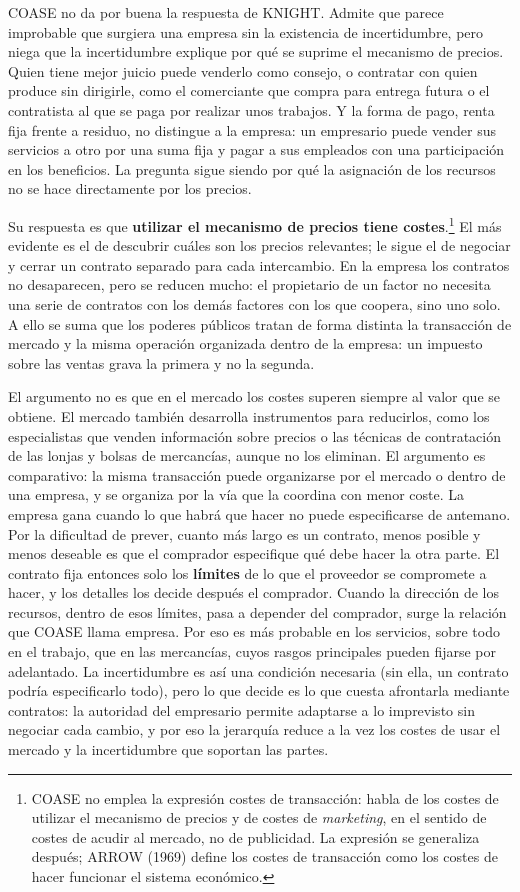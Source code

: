\documentclass[10pt,a4paper]{article}
\begin{document}
COASE no da por buena la respuesta de KNIGHT. Admite que parece improbable que surgiera una empresa sin la existencia de incertidumbre, pero niega que la incertidumbre explique por qué se suprime el mecanismo de precios. Quien tiene mejor juicio puede venderlo como consejo, o contratar con quien produce sin dirigirle, como el comerciante que compra para entrega futura o el contratista al que se paga por realizar unos trabajos. Y la forma de pago, renta fija frente a residuo, no distingue a la empresa: un empresario puede vender sus servicios a otro por una suma fija y pagar a sus empleados con una participación en los beneficios. La pregunta sigue siendo por qué la asignación de los recursos no se hace directamente por los precios.

Su respuesta es que \textbf{utilizar el mecanismo de precios tiene costes}.\footnote{%
    COASE no emplea la expresión costes de transacción: habla de los costes de utilizar el mecanismo de precios y de costes de \textit{marketing}, en el sentido de costes de acudir al mercado, no de publicidad. La expresión se generaliza después; ARROW (1969) define los costes de transacción como los costes de hacer funcionar el sistema económico.
} El más evidente es el de descubrir cuáles son los precios relevantes; le sigue el de negociar y cerrar un contrato separado para cada intercambio. En la empresa los contratos no desaparecen, pero se reducen mucho: el propietario de un factor no necesita una serie de contratos con los demás factores con los que coopera, sino uno solo. A ello se suma que los poderes públicos tratan de forma distinta la transacción de mercado y la misma operación organizada dentro de la empresa: un impuesto sobre las ventas grava la primera y no la segunda.

El argumento no es que en el mercado los costes superen siempre al valor que se obtiene. El mercado también desarrolla instrumentos para reducirlos, como los especialistas que venden información sobre precios o las técnicas de contratación de las lonjas y bolsas de mercancías, aunque no los eliminan. El argumento es comparativo: la misma transacción puede organizarse por el mercado o dentro de una empresa, y se organiza por la vía que la coordina con menor coste. La empresa gana cuando lo que habrá que hacer no puede especificarse de antemano. Por la dificultad de prever, cuanto más largo es un contrato, menos posible y menos deseable es que el comprador especifique qué debe hacer la otra parte. El contrato fija entonces solo los \textbf{límites} de lo que el proveedor se compromete a hacer, y los detalles los decide después el comprador. Cuando la dirección de los recursos, dentro de esos límites, pasa a depender del comprador, surge la relación que COASE llama empresa. Por eso es más probable en los servicios, sobre todo en el trabajo, que en las mercancías, cuyos rasgos principales pueden fijarse por adelantado. La incertidumbre es así una condición necesaria (sin ella, un contrato podría especificarlo todo), pero lo que decide es lo que cuesta afrontarla mediante contratos: la autoridad del empresario permite adaptarse a lo imprevisto sin negociar cada cambio, y por eso la jerarquía reduce a la vez los costes de usar el mercado y la incertidumbre que soportan las partes.
\end{document}
